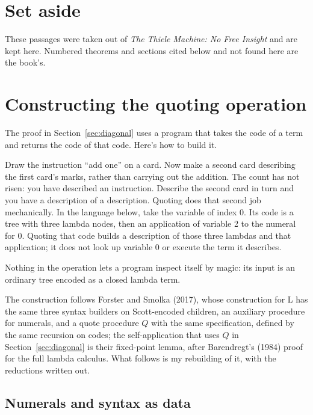 \documentclass[11pt,twoside]{article}
\theoremstyle{thielethm}
\theoremstyle{thieledef}
\theoremstyle{thieledef}
\theoremstyle{thieledef}
\theoremstyle{thielethm}
\theoremstyle{thieleobs}
\theoremstyle{thielethm}
\begin{document}
\pagestyle{book}

\section*{Set aside}

These passages were taken out of \textit{The Thiele Machine: No Free Insight} and are kept here. Numbered theorems and sections cited below and not found here are the book's.

\tableofcontents
\clearpage

\section{Constructing the quoting operation}
\label{sec:quoting-construction}

The proof in Section~\ref{sec:diagonal} uses a program that takes the code of a term
and returns the code of that code. Here's how to build it.

Draw the instruction ``add one'' on a card. Now make a second card describing the
first card's marks, rather than carrying out the addition. The count has not risen:
you have described an instruction. Describe the second card in turn and you have
a description of a description. Quoting does that second job mechanically. In the
language below, take the variable of index 0. Its code is a tree with three lambda
nodes, then an application of variable 2 to the numeral for 0. Quoting that code
builds a description of those three lambdas and that application; it does not
look up variable 0 or execute the term it describes.

Nothing in the operation lets a program inspect itself by magic: its input is an
ordinary tree encoded as a closed lambda term.

The construction follows Forster and Smolka (2017), whose construction for L has the same
three syntax builders on Scott-encoded children, an auxiliary procedure for numerals, and a quote
procedure $Q$ with the same specification, defined by the same recursion on codes; the
self-application that uses $Q$ in Section~\ref{sec:diagonal} is their fixed-point lemma, after
Barendregt's (1984) proof for the full lambda calculus. What follows is my rebuilding of it, with
the reductions written out.

\subsection{Numerals and syntax as data}
\end{document}
